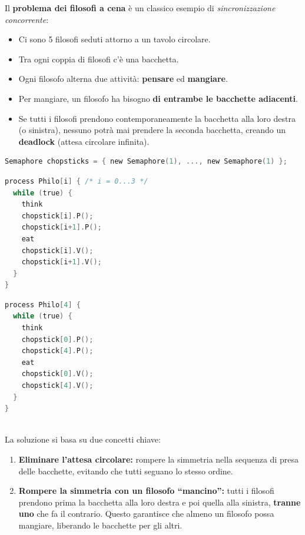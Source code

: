 \documentclass[a4paper,12pt]{article}
\begin{document}
Il \textbf{problema dei filosofi a cena} è un classico esempio di \textit{sincronizzazione concorrente}:
\begin{itemize}
    \item Ci sono 5 filosofi seduti attorno a un tavolo circolare.
    \item Tra ogni coppia di filosofi c’è una bacchetta.
    \item Ogni filosofo alterna due attività: \textbf{pensare} ed \textbf{mangiare}.
    \item Per mangiare, un filosofo ha bisogno \textbf{di entrambe le bacchette adiacenti}.
    \item Se tutti i filosofi prendono contemporaneamente la bacchetta alla loro destra (o sinistra), nessuno potrà mai prendere la seconda bacchetta, creando un \textbf{deadlock} (attesa circolare infinita).
\end{itemize}
\begin{lstlisting}[language=C]
Semaphore chopsticks = { new Semaphore(1), ..., new Semaphore(1) };
\end{lstlisting}
\begin{minipage}{0.58\textwidth}
\begin{lstlisting}[language=C]
process Philo[i] { /* i = 0...3 */
  while (true) {
    think
    chopstick[i].P();
    chopstick[i+1].P();
    eat
    chopstick[i].V();
    chopstick[i+1].V();
  }
}
\end{lstlisting}
\end{minipage}
\begin{minipage}{0.48\textwidth}
\begin{lstlisting}[language=C]
process Philo[4] {
  while (true) {
    think
    chopstick[0].P();
    chopstick[4].P();
    eat
    chopstick[0].V();
    chopstick[4].V();
  }
}
\end{lstlisting}
\end{minipage}\\
La soluzione si basa su due concetti chiave:

\begin{enumerate}
    \item \textbf{Eliminare l’attesa circolare:} rompere la simmetria nella sequenza di presa delle bacchette, evitando che tutti seguano lo stesso ordine.
    \item \textbf{Rompere la simmetria con un filosofo ``mancino'':} tutti i filosofi prendono prima la bacchetta alla loro destra e poi quella alla sinistra, \textbf{tranne uno} che fa il contrario. Questo garantisce che almeno un filosofo possa mangiare, liberando le bacchette per gli altri.
\end{enumerate}
\end{document}
